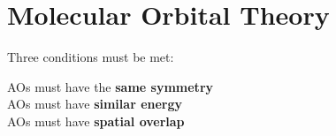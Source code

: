 \section{Molecular Orbital Theory}

Three conditions must be met:

AOs must have the \textbf{same symmetry}\\
AOs must have \textbf{similar energy}\\
AOs must have \textbf{spatial overlap}
